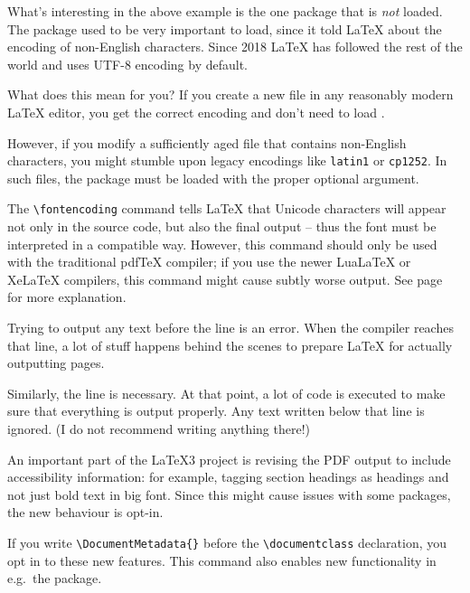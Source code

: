 \begin{latexthree}
What's interesting in the above example is the one package that is \emph{not} loaded.
The  package used to be very important to load,
since it told \LaTeX{} about the encoding of non-English characters.
Since 2018 \LaTeX{} has followed the rest of the world
and uses UTF-8 encoding by default.

What does this mean for you?
If you create a new file in any reasonably modern \LaTeX{} editor,
you get the correct encoding and don't need to load .

However, if you modify a sufficiently aged file that contains non-English characters,
you might stumble upon legacy encodings like \texttt{latin1} or \texttt{cp1252}.
In such files, the  package must be loaded with the proper optional argument.
\end{latexthree}

The \verb|\fontencoding| command tells \LaTeX{} that Unicode characters will appear
not only in the source code, but also the final output
-- thus the font must be interpreted in a compatible way.
However, this command should only be used with the traditional pdfTeX compiler;
if you use the newer LuaLaTeX or XeLaTeX compilers,
this command might cause subtly worse output.
See page~\pageref{rem:font encoding} for more explanation.


Trying to output any text before the \verb|| line is an error.
%
When the compiler reaches that line,
a lot of stuff happens behind the scenes to prepare \LaTeX{} for actually outputting pages.

Similarly, the \verb|| line is necessary.
At that point, a lot of code is executed to make sure that everything is output properly.
Any text written below that line is ignored.
(I do not recommend writing anything there!)

\begin{latexthree}
An important part of the \LaTeX3 project is revising the PDF output
to include accessibility information:
for example, tagging section headings as headings and not just bold text in big font.
Since this might cause issues with some packages, the new behaviour is opt-in.

If you write \verb|\DocumentMetadata{}|
before the \verb|\documentclass| declaration, you opt in to these new features.
This command also enables new functionality in e.g.\ the  package.
\end{latexthree}


